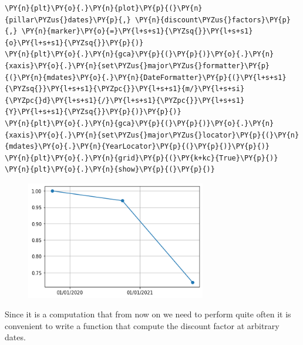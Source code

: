 \begin{tcolorbox}[breakable, size=fbox, boxrule=1pt, pad at break*=1mm,colback=cellbackground, colframe=cellborder]
\begin{Verbatim}[commandchars=\\\{\}]
\PY{n}{plt}\PY{o}{.}\PY{n}{plot}\PY{p}{(}\PY{n}{pillar\PYZus{}dates}\PY{p}{,} \PY{n}{discount\PYZus{}factors}\PY{p}{,} \PY{n}{marker}\PY{o}{=}\PY{l+s+s1}{\PYZsq{}}\PY{l+s+s1}{o}\PY{l+s+s1}{\PYZsq{}}\PY{p}{)}
\PY{n}{plt}\PY{o}{.}\PY{n}{gca}\PY{p}{(}\PY{p}{)}\PY{o}{.}\PY{n}{xaxis}\PY{o}{.}\PY{n}{set\PYZus{}major\PYZus{}formatter}\PY{p}{(}\PY{n}{mdates}\PY{o}{.}\PY{n}{DateFormatter}\PY{p}{(}\PY{l+s+s1}{\PYZsq{}}\PY{l+s+s1}{\PYZpc{}}\PY{l+s+s1}{m/}\PY{l+s+si}{\PYZpc{}d}\PY{l+s+s1}{/}\PY{l+s+s1}{\PYZpc{}}\PY{l+s+s1}{Y}\PY{l+s+s1}{\PYZsq{}}\PY{p}{)}\PY{p}{)}
\PY{n}{plt}\PY{o}{.}\PY{n}{gca}\PY{p}{(}\PY{p}{)}\PY{o}{.}\PY{n}{xaxis}\PY{o}{.}\PY{n}{set\PYZus{}major\PYZus{}locator}\PY{p}{(}\PY{n}{mdates}\PY{o}{.}\PY{n}{YearLocator}\PY{p}{(}\PY{p}{)}\PY{p}{)}
\PY{n}{plt}\PY{o}{.}\PY{n}{grid}\PY{p}{(}\PY{k+kc}{True}\PY{p}{)}
\PY{n}{plt}\PY{o}{.}\PY{n}{show}\PY{p}{(}\PY{p}{)}
\end{Verbatim}
\end{tcolorbox}
\vfill
\begin{figure}[h]
  \centering
  \includegraphics[width=0.7\textwidth]{lecture_3_10_0.png}
\end{figure}
    
Since it is a computation that from now on we need to perform quite often it is convenient to write a function that compute the discount factor at arbitrary dates.

